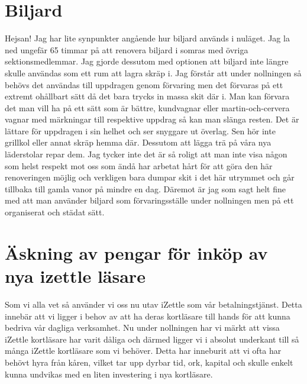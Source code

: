 \documentclass[10pt]{article}
\def\doctype{Handlingar} %
\def\mname{Styrelsemöte} %
\def\mnum{S18/19} %
\begin{document}
    
    \heading{{\doctype} till {\mname} {\mnum}}
    
    \section*{Biljard}
    
 	Hejsan! Jag har lite synpunkter angående hur biljard används i nuläget. Jag la ned ungefär
65 timmar på att renovera biljard i somras med övriga sektionsmedlemmar. Jag gjorde
dessutom med optionen att biljard inte längre skulle användas som ett rum att lagra skräp i.
Jag förstår att under nollningen så behövs det användas till uppdragen genom förvaring men
det förvaras på ett extremt ohållbart sätt då det bara trycks in massa skit där i. Man kan
förvara det man vill ha på ett sätt som är bättre, kundvagnar eller martin-och-cervera vagnar
med märkningar till respektive uppdrag så kan man slänga resten. Det är lättare för
uppdragen i sin helhet och ser snyggare ut överlag. Sen hör inte grillkol eller annat skräp
hemma där. Dessutom att lägga trä på våra nya läderstolar repar dem. Jag tycker inte det är
så roligt att man inte visa någon som helst respekt mot oss som ändå har arbetat hårt för att
göra den här renoveringen möjlig och verkligen bara dumpar skit i det här utrymmet och går
tillbaka till gamla vanor på mindre en dag. Däremot är jag som sagt helt fine med att man
använder biljard som förvaringsställe under nollningen men på ett organiserat och städat
sätt.

   

    \begin{signatures}{1}
    \textit{\mvh}
    \signature{Adam Belfrage}{}
    \end{signatures}
    



    \newpage

    \section*{Äskning av pengar för inköp av nya izettle läsare}
    
 	Som vi alla vet så använder vi oss nu utav iZettle som vår betalningstjänst. Detta innebär att vi ligger i behov av att ha deras kortläsare till hands för att kunna bedriva vår dagliga verksamhet. 
Nu under nollningen har vi märkt att vissa iZettle kortläsare har varit dåliga och därmed ligger vi i absolut underkant till så många iZettle kortläsare som vi behöver. Detta har inneburit att vi ofta har behövt hyra från kåren, vilket tar upp dyrbar tid, ork, kapital och skulle enkelt kunna undvikas med en liten investering i nya kortläsare.
\end{document}

